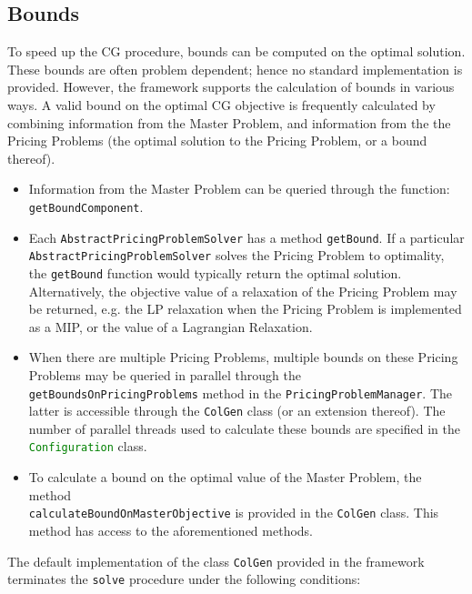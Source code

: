 \documentclass[a4paper]{article}
\newcommand{\code}[1]{\lstinline[language=java, style=seminar]!#1!}
\begin{document}
\subsection{Bounds}\label{subsec:bounds}
To speed up the CG procedure, bounds can be computed on the optimal solution. These bounds are often problem dependent; hence no standard implementation is provided. However, the framework supports the calculation of bounds in various ways. A valid bound on the optimal CG objective is frequently calculated by combining information from the Master Problem, and information from the the Pricing Problems (the optimal solution to the Pricing Problem, or a bound thereof).
\begin{itemize}
 \item Information from the Master Problem can be queried through the function: \code{getBoundComponent}.
 \item Each \code{AbstractPricingProblemSolver} has a method \code{getBound}. If a particular\\ \code{AbstractPricingProblemSolver} solves the Pricing Problem to optimality, the \code{getBound} function would typically return the optimal solution. Alternatively, the objective value of a relaxation of the Pricing Problem may be returned, e.g. the LP relaxation when the Pricing Problem is implemented as a MIP, or the value of a Lagrangian Relaxation.
 \item When there are multiple Pricing Problems, multiple bounds on these Pricing Problems may be queried in parallel through the \code{getBoundsOnPricingProblems} method in the \code{PricingProblemManager}. The latter is accessible through the \code{ColGen} class (or an extension thereof). The number of parallel threads used to calculate these bounds are specified in the \code{Configuration} class.
 \item To calculate a bound on the optimal value of the Master Problem, the method\\ \code{calculateBoundOnMasterObjective} is provided in the \code{ColGen} class. This method has access to the aforementioned methods.
\end{itemize}
The default implementation of the class \code{ColGen} provided in the framework terminates the \code{solve} procedure under the following conditions:
\end{document}
